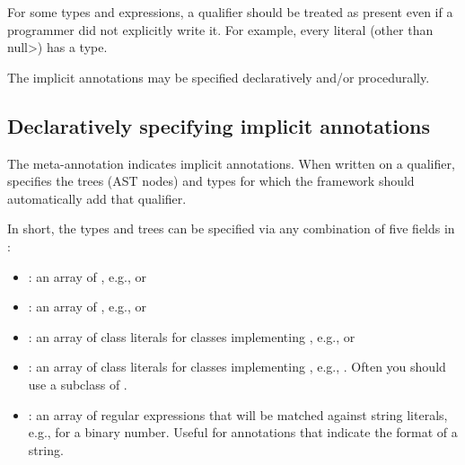 For some types and expressions, a qualifier should be treated as present
even if a programmer did not explicitly write it.  For example, every
literal (other than \<null>) has a  type.

The implicit annotations may be specified declaratively and/or procedurally.

\subsection{Declaratively specifying implicit annotations\label{declarative-type-introduction}}

The  meta-annotation indicates implicit annotations.
When written on a qualifier, 
specifies the trees (AST nodes) and types for which the framework should
automatically add that qualifier.

In short, the types and trees can be
specified via any combination of five fields in :

  \begin{itemize}
  \item {}: an array of
    \href{\TreeAPIBase{}/tree/Tree.Kind.html?is-external=true}{}, e.g.,
     or 
  \item {}: an array of
    , e.g., 
    or 
  \item
    \begin{sloppypar}
    : an array of class literals for classes
    implementing , e.g.,
     or 
    \end{sloppypar}
  \item {}: an array of class literals for classes
    implementing , e.g.,
    .  Often you should use
    a subclass of .
  \item {}: an array of regular expressions that will
    be matched against
    string literals, e.g.,  for a binary number.  Useful
    for annotations that indicate the format of a string.
  \end{itemize}

